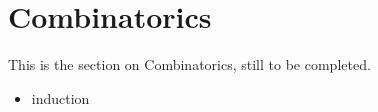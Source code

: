 \section{Combinatorics}\label{sec:combinatorics}

This is the section on Combinatorics, still to be completed.

\begin{itemize}
    \item induction
\end{itemize}
